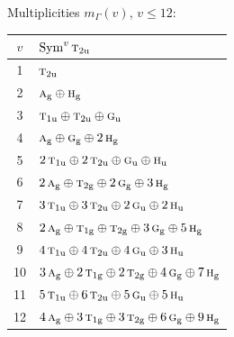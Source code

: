 \documentclass[11pt]{article}
\newcommand{\irr}[1]{\text{\normalfont\scshape #1}}
\newcommand{\ptag}[1]{\mathrm{#1}}
\begin{document}
Multiplicities $m_\Gamma(v)$, $v\le12$:
\begin{longtable}{c l}\hline $v$ & $\operatorname{Sym}^{v}\irr{t}_{2\ptag{u}}$\\ \hline\endhead
1 & $\irr{t}_{2\ptag{u}}$\\
2 & $\irr{a}_{\ptag{g}}\oplus \irr{h}_{\ptag{g}}$\\
3 & $\irr{t}_{1\ptag{u}}\oplus \irr{t}_{2\ptag{u}}\oplus \irr{g}_{\ptag{u}}$\\
4 & $\irr{a}_{\ptag{g}}\oplus \irr{g}_{\ptag{g}}\oplus 2\,\irr{h}_{\ptag{g}}$\\
5 & $2\,\irr{t}_{1\ptag{u}}\oplus 2\,\irr{t}_{2\ptag{u}}\oplus \irr{g}_{\ptag{u}}\oplus \irr{h}_{\ptag{u}}$\\
6 & $2\,\irr{a}_{\ptag{g}}\oplus \irr{t}_{2\ptag{g}}\oplus 2\,\irr{g}_{\ptag{g}}\oplus 3\,\irr{h}_{\ptag{g}}$\\
7 & $3\,\irr{t}_{1\ptag{u}}\oplus 3\,\irr{t}_{2\ptag{u}}\oplus 2\,\irr{g}_{\ptag{u}}\oplus 2\,\irr{h}_{\ptag{u}}$\\
8 & $2\,\irr{a}_{\ptag{g}}\oplus \irr{t}_{1\ptag{g}}\oplus \irr{t}_{2\ptag{g}}\oplus 3\,\irr{g}_{\ptag{g}}\oplus 5\,\irr{h}_{\ptag{g}}$\\
9 & $4\,\irr{t}_{1\ptag{u}}\oplus 4\,\irr{t}_{2\ptag{u}}\oplus 4\,\irr{g}_{\ptag{u}}\oplus 3\,\irr{h}_{\ptag{u}}$\\
10 & $3\,\irr{a}_{\ptag{g}}\oplus 2\,\irr{t}_{1\ptag{g}}\oplus 2\,\irr{t}_{2\ptag{g}}\oplus 4\,\irr{g}_{\ptag{g}}\oplus 7\,\irr{h}_{\ptag{g}}$\\
11 & $5\,\irr{t}_{1\ptag{u}}\oplus 6\,\irr{t}_{2\ptag{u}}\oplus 5\,\irr{g}_{\ptag{u}}\oplus 5\,\irr{h}_{\ptag{u}}$\\
12 & $4\,\irr{a}_{\ptag{g}}\oplus 3\,\irr{t}_{1\ptag{g}}\oplus 3\,\irr{t}_{2\ptag{g}}\oplus 6\,\irr{g}_{\ptag{g}}\oplus 9\,\irr{h}_{\ptag{g}}$\\
\hline\end{longtable}
\end{document}
